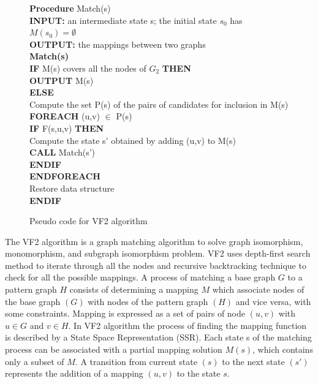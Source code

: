 \begin{figure}

\begin{algorithm}[H]
\begin{algorithmic}
 \LState  \textbf{Procedure} Match(s)\\
\textbf{INPUT:}  an intermediate state s; the initial state $s_0$ has $M(s_0)=\emptyset$\\
\textbf{OUTPUT:} the mappings between two graphs\\
\textbf{Match(s)}\\
 \textbf{IF} M(s) covers all the nodes of $G_2$ \textbf{THEN}\\
\quad \textbf{OUTPUT} M(s)\\
\textbf{ELSE}\\
 \quad    Compute the set P(s) of the pairs of candidates for inclusion in M(s)\\
\quad\textbf{FOREACH} (u,v) $\in$ P(s)\\
\quad\quad\textbf{IF} F(s,u,v) \textbf{THEN}\\
\quad\quad\quad    Compute the state s' obtained by adding (u,v) to M(s)\\
\quad\quad\quad\textbf{CALL} Match(s')\\
\quad\quad\textbf{ENDIF}\\
\quad\textbf{ENDFOREACH}\\
\quad Restore data structure\\
\textbf{ENDIF}\\

\end{algorithmic}
\end{algorithm}
\caption{Pseudo code for VF2 algorithm\cite{cordella2001improved}}
\label{fig:VF2}
\end{figure}


The VF2 algorithm is a graph matching algorithm to solve graph isomorphism, monomorphism, and  subgraph isomorphism problem. VF2 uses depth-first search method to iterate through all the nodes and recursive backtracking technique to check for all the possible mappings. A process of matching 
a base graph $G$ to a pattern graph $H$ consists of determining a mapping $M$ which associate nodes of the base graph $(G)$ with nodes of the pattern graph $(H)$ and vice versa, with some constraints.
Mapping is expressed as a set of pairs of node $(u,v)$ with $u \in G$ and $v \in H$. 
In VF2 algorithm the process of finding the mapping function is described by a  State Space Representation (SSR). Each state s of the matching process can be associated with a partial mapping solution $M(s)$,
which contains only a subset of $M$. A transition from current state $(s)$ to the next state $(s')$ represents the addition of a mapping $(u,v)$ to the state $s$.


